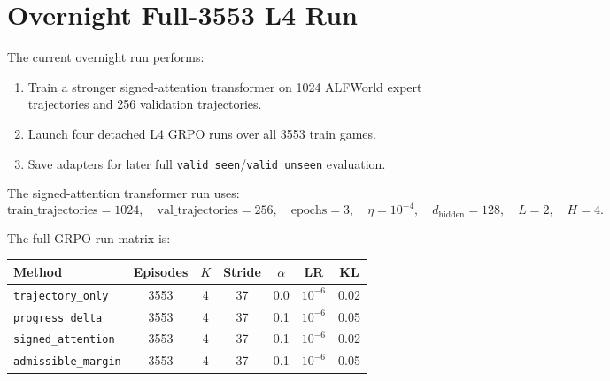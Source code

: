 \documentclass[10pt]{article}
\newcommand{\method}[1]{\texttt{#1}}
\begin{document}
\section{Overnight Full-3553 L4 Run}
The current overnight run performs:
\begin{enumerate}
    \item Train a stronger signed-attention transformer on 1024 ALFWorld expert trajectories and 256 validation trajectories.
    \item Launch four detached L4 GRPO runs over all 3553 train games.
    \item Save adapters for later full \texttt{valid\_seen}/\texttt{valid\_unseen} evaluation.
\end{enumerate}

The signed-attention transformer run uses:
\[
\mathrm{train\_trajectories}=1024,\quad
\mathrm{val\_trajectories}=256,\quad
\mathrm{epochs}=3,\quad
\eta=10^{-4},\quad
d_{\mathrm{hidden}}=128,\quad L=2,\quad H=4.
\]

The full GRPO run matrix is:
\begin{center}
\begin{tabular}{lcccccc}
\toprule
Method & Episodes & \(K\) & Stride & \(\alpha\) & LR & KL \\
\midrule
\method{trajectory\_only} & 3553 & 4 & 37 & 0.0 & \(10^{-6}\) & 0.02 \\
\method{progress\_delta} & 3553 & 4 & 37 & 0.1 & \(10^{-6}\) & 0.05 \\
\method{signed\_attention} & 3553 & 4 & 37 & 0.1 & \(10^{-6}\) & 0.02 \\
\method{admissible\_margin} & 3553 & 4 & 37 & 0.1 & \(10^{-6}\) & 0.05 \\
\bottomrule
\end{tabular}
\end{center}
\end{document}
